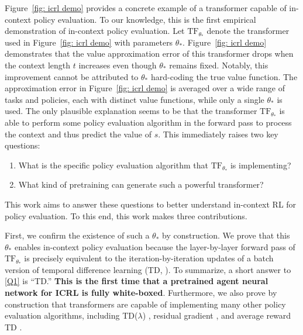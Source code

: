 \documentclass{article}
\newcommand{\ehb}[1]{({\color{violet} {Ethan: #1}})}
\newcommand{\sz}[1]{({\color{red} {Shangtong: #1}})}
\newcommand{\tb}[1]{{\textbf{#1}}}
\newcommand{\tf}{\text{TF}}
\begin{document}
Figure~\ref{fig: icrl demo} provides a concrete example of a transformer capable of in-context policy evaluation.
To our knowledge, this is the first empirical demonstration of in-context policy evaluation. 
Let $\tf_{\theta_*}$ denote the transformer used in Figure~\ref{fig: icrl demo} with parameters $\theta_*$.
Figure~\ref{fig: icrl demo} demonstrates that the value approximation error of this transformer drops when the context length $t$ increases even though $\theta_*$ remains fixed. 
Notably, this improvement cannot be attributed to $\theta_*$ hard-coding the true value function. 
The approximation error in Figure~\ref{fig: icrl demo} is averaged over a wide range of tasks and policies, each with distinct value functions, while only a single $\theta_*$ is used. 
The only plausible explanation seems to be that the transformer $\tf_{\theta_*}$ is able to perform some policy evaluation algorithm in the forward pass to process the context and thus predict the value of $s$.
This immediately raises two key questions:
\begin{enumerate}[topsep=0pt,itemsep=-1ex,partopsep=1ex,parsep=1ex, start=1, label={ (Q\arabic*)}]
    \item What is the specific policy evaluation algorithm that $\tf_{\theta_*}$ is implementing? \label{Q1}
    \item What kind of pretraining can generate such a powerful transformer? \label{Q2}
\end{enumerate}
This work aims to answer these questions to better understand in-context RL for policy evaluation.
To this end, this work makes three contributions.

First, we confirm the existence of such a $\theta_*$ by construction.
We prove that this $\theta_*$ enables in-context policy evaluation because the layer-by-layer forward pass of $\tf_{\theta_*}$ is precisely equivalent to the iteration-by-iteration updates of a batch version of temporal difference learning (TD, \citet{sutton1988learning}). 
To summarize, a short answer to \ref{Q1} is ``TD.''
\tb{This is the first time that a pretrained agent neural network for ICRL is fully white-boxed}.
Furthermore,
we also prove by construction that transformers are capable of implementing many other policy evaluation algorithms, including TD($\lambda$) \citep{sutton1988learning}, residual gradient \citep{baird1995residual}, and average reward TD \citep{tsitsiklis1999average}.
\end{document}
